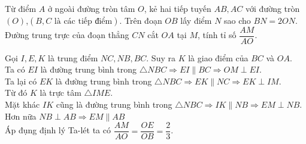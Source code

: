 \begin{ex}%
Từ điểm $A$ ở ngoài đường tròn tâm $O$, kẻ hai tiếp tuyến $AB,AC$ với đường tròn $\left(O\right)$,$\left(B, C \text{ là các tiếp điểm} \right)$. Trên đoạn $OB$ lấy điểm $N$ sao cho $BN=2ON$. Đường trung trực của đoạn thẳng $CN$ cắt $OA$ tại $M$, tính tỉ số $\dfrac{AM}{AO}$.  
\loigiai
    {
     \begin{center}
    \end{center}
    Gọi $I, E, K$ là trung điểm $NC, NB, BC$. Suy ra $K$ là giao điểm của $BC$ và $OA$.\\
    Ta có $EI$ là đường trung bình trong $\triangle NBC \Rightarrow EI \parallel BC\Rightarrow OM \perp EI$.\\
    Ta lại có $EK$ là đường trung bình trong $\triangle NBC\Rightarrow EK \parallel NC \Rightarrow EK \perp IM$.\\
    Từ đó $K$ là trực tâm $\triangle IME$.\\
    Mặt khác $IK $ cũng là đường trung bình trong $\triangle NBC\Rightarrow IK \parallel NB \Rightarrow EM \perp NB$.\\
    Hơn nữa $NB \perp AB \Rightarrow EM \parallel AB$\\
    Áp đụng định lý Ta-lét ta có $\dfrac{AM}{AO}=\dfrac{OE}{OB}=\dfrac{2}{3}$. 
    }
\end{ex}

